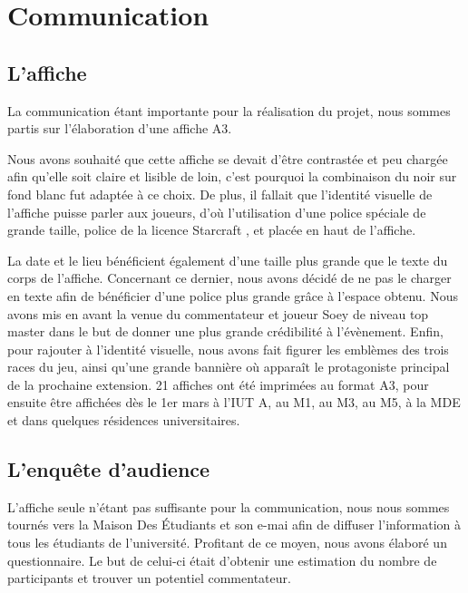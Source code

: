 \section{Communication}%
\label{sec:communication}

\subsection{L'affiche}%
\label{sub:l_affiche}

La communication étant importante pour la réalisation du projet, nous sommes partis sur l'élaboration
d'une affiche A3.

Nous avons souhaité que cette affiche se devait d’être contrastée et peu chargée afin qu’elle soit
claire et lisible de loin, c’est pourquoi la combinaison du noir sur fond blanc fut adaptée à ce choix.
De plus, il fallait que l’identité visuelle de l’affiche puisse parler aux joueurs, d’où l’utilisation
d’une police spéciale de grande taille, police de la licence \og Starcraft \fg{}, et placée en haut de l’affiche.

La date et le lieu bénéficient également d’une taille plus grande que le texte du corps de l’affiche.
Concernant ce dernier, nous avons décidé de ne pas le charger en texte afin de bénéficier d’une police
plus grande grâce à l’espace obtenu.
Nous avons mis en avant la venue du commentateur et joueur Soey  de niveau \og top master \fg{}  dans le but
de donner une plus grande crédibilité à l’évènement.
Enfin, pour rajouter à l’identité visuelle, nous avons fait figurer  les emblèmes des trois races du jeu,
ainsi qu’une grande bannière où apparaît le protagoniste principal de la prochaine extension.
21 affiches ont été imprimées au format A3, pour ensuite être affichées dès le 1er mars à l’IUT A, au M1,
au M3, au M5, à la MDE et dans quelques résidences universitaires.

\subsection{L'enquête d'audience}%
\label{sub:l_enquete_d_audience}

L'affiche seule n'étant pas suffisante pour la communication, nous nous sommes tournés vers la
Maison Des Étudiants et son e-mai afin de diffuser l'information à tous les étudiants de l'université.
Profitant de ce moyen, nous avons élaboré un questionnaire. Le but de celui-ci était d'obtenir une estimation
du nombre de participants et trouver un potentiel commentateur.

